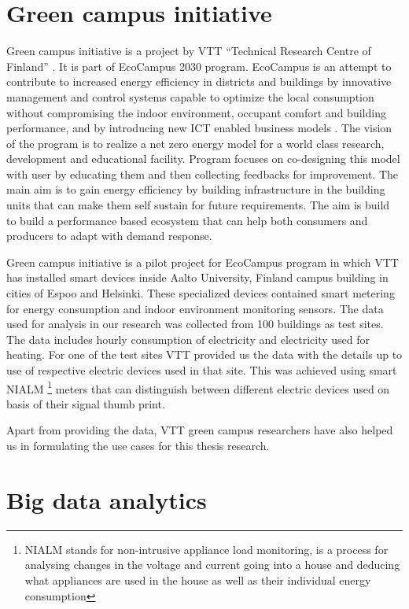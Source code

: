 \section{Green campus initiative}

Green campus initiative is a project by VTT  ``Technical Research Centre of Finland'' . It is part of EcoCampus 2030 program. EcoCampus is an attempt to contribute to increased energy efficiency in districts and buildings by innovative management and control systems capable to optimize the local consumption without compromising the indoor environment, occupant comfort and building performance, and by introducing new ICT enabled business models \cite{ greencampus}. The vision of the program is to realize a net zero energy model for a world class research, development and educational facility. Program focuses on co-designing this model with user by educating them and then collecting feedbacks for improvement. The main aim is to gain energy efficiency by building infrastructure in the building units that can make them self sustain for future requirements. The aim is build to build a performance based ecosystem that can help both consumers and producers to adapt with demand response.

Green campus initiative is a pilot project for EcoCampus program  in which VTT has installed smart devices inside Aalto University, Finland campus building in cities of Espoo and Helsinki. These specialized devices contained smart metering for energy consumption and indoor environment monitoring sensors.  The data used for analysis in our research was collected from 100 buildings as test sites. The data includes hourly consumption of electricity and electricity used for heating. For one of the test sites VTT provided us the data with the details up to use of  respective electric devices used in that site. This was achieved using smart NIALM \footnote{ NIALM stands for non-intrusive appliance load monitoring,  is a process for analysing changes in the voltage and current going into a house and deducing what appliances are used in the house as well as their individual energy consumption }\cite{ hart1992nonintrusive} meters that can distinguish between different electric devices used on basis of their signal thumb print.

Apart from providing the data, VTT green campus researchers have also helped us in formulating the use cases for this thesis research.


\section{Big data analytics}

